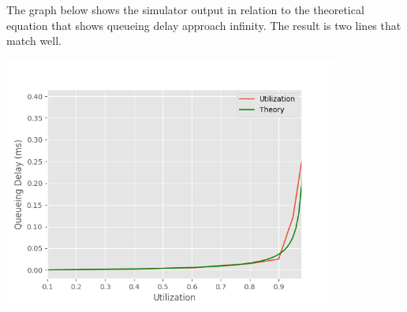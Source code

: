 \documentclass[fleqn,11pt]{article}
\begin{document}
\noindent
The graph below shows the simulator output in relation to the theoretical
equation that shows queueing delay approach infinity. The result is two lines
that match well.

\begin{center}
  \includegraphics[width=11cm]{queueing_theory}
\end{center}
\end{document}
